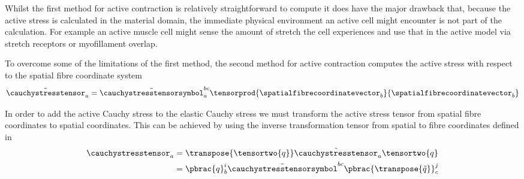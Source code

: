 Whilst the first method for active contraction is relatively
straightforward to compute it does have the major drawback that,
because the active stress is calculated in the material domain, the
immediate physical environment an active cell might encounter is not
part of the calculation. For example an active muscle cell might sense
the amount of stretch the cell experiences and use that in the active
model via stretch receptors or myofillament overlap.

To overcome some of the limitations of the first method, the second
method for active contraction computes the active stress with respect
to the spatial fibre coordinate system \ie
\begin{equation}
  \tilde{\cauchystresstensor}_{a}=\tilde{\cauchystresstensorsymbol}^{bc}_{a}
  \tensorprod{\spatialfibrecoordinatevector_{b}}{\spatialfibrecoordinatevector_{b}}
\end{equation}

In order to add the active Cauchy stress to the elastic Cauchy stress
we must transform the active stress tensor from spatial fibre
coordinates to spatial coordinates. This can be achieved by using the
inverse transformation tensor from spatial to fibre coordinates
defined in  \ie
\begin{equation}
  \begin{aligned}
    \cauchystresstensor_{a}&=\transpose{\tensortwo{q}}\tilde{\cauchystresstensor}_{a}\tensortwo{q}\\
    &=\pbrac{q}^{i}_{b}\tilde{\cauchystresstensorsymbol}^{bc}\pbrac{\transpose{\tilde{q}}}^{j}_{c}
  \end{aligned}
\end{equation}

